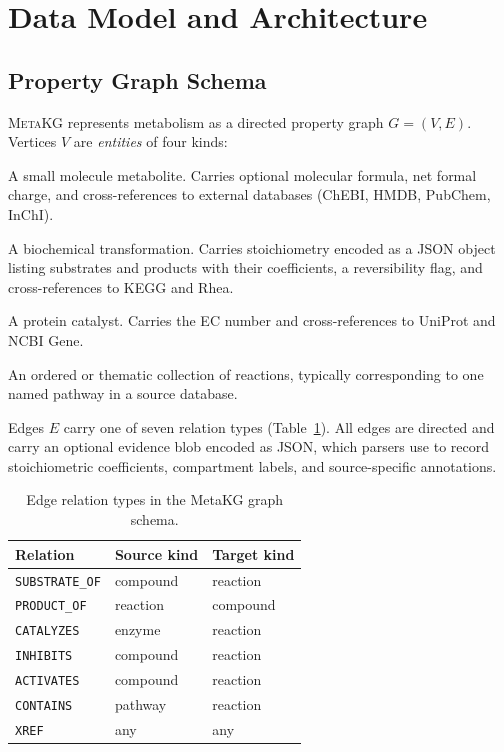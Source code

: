 \documentclass[10pt]{article}
\begin{document}
\section{Data Model and Architecture}
\label{sec:design}

\subsection{Property Graph Schema}

\textsc{MetaKG} represents metabolism as a directed property graph
$G = (V, E)$. Vertices $V$ are \emph{entities} of four kinds:

\begin{description}[leftmargin=*, itemsep=2pt]
  \item[\texttt{compound}] A small molecule metabolite. Carries optional
    molecular formula, net formal charge, and cross-references to external
    databases (ChEBI, HMDB, PubChem, InChI).
  \item[\texttt{reaction}] A biochemical transformation. Carries
    stoichiometry encoded as a JSON object listing substrates and products
    with their coefficients, a reversibility flag, and cross-references to
    KEGG and Rhea.
  \item[\texttt{enzyme}] A protein catalyst. Carries the EC number and
    cross-references to UniProt and NCBI Gene.
  \item[\texttt{pathway}] An ordered or thematic collection of reactions,
    typically corresponding to one named pathway in a source database.
\end{description}

Edges $E$ carry one of seven relation types (Table~\ref{tab:relations}).
All edges are directed and carry an optional evidence blob encoded as JSON,
which parsers use to record stoichiometric coefficients, compartment labels,
and source-specific annotations.

\begin{table}[H]
  \centering
  \caption{Edge relation types in the MetaKG graph schema.}
  \label{tab:relations}
  \small
  \begin{tabular}{@{}lll@{}}
    \toprule
    Relation & Source kind & Target kind \\
    \midrule
    \texttt{SUBSTRATE\_OF}  & compound  & reaction  \\
    \texttt{PRODUCT\_OF}    & reaction  & compound  \\
    \texttt{CATALYZES}      & enzyme    & reaction  \\
    \texttt{INHIBITS}       & compound  & reaction  \\
    \texttt{ACTIVATES}      & compound  & reaction  \\
    \texttt{CONTAINS}       & pathway   & reaction  \\
    \texttt{XREF}           & any       & any       \\
    \bottomrule
  \end{tabular}
\end{table}
\end{document}
